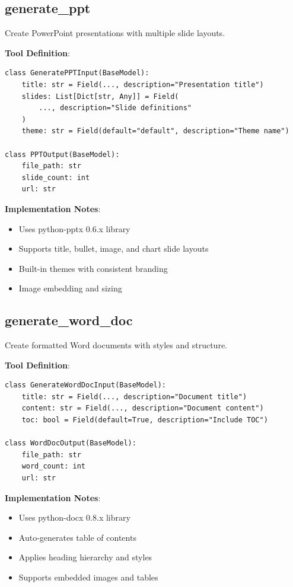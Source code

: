 \documentclass{report}
\begin{document}
\subsection{generate\_ppt}

Create PowerPoint presentations with multiple slide layouts.

\textbf{Tool Definition}:
\begin{lstlisting}
class GeneratePPTInput(BaseModel):
    title: str = Field(..., description="Presentation title")
    slides: List[Dict[str, Any]] = Field(
        ..., description="Slide definitions"
    )
    theme: str = Field(default="default", description="Theme name")

class PPTOutput(BaseModel):
    file_path: str
    slide_count: int
    url: str
\end{lstlisting}

\textbf{Implementation Notes}:
\begin{itemize}
    \item Uses python-pptx 0.6.x library
    \item Supports title, bullet, image, and chart slide layouts
    \item Built-in themes with consistent branding
    \item Image embedding and sizing
\end{itemize}

\subsection{generate\_word\_doc}

Create formatted Word documents with styles and structure.

\textbf{Tool Definition}:
\begin{lstlisting}
class GenerateWordDocInput(BaseModel):
    title: str = Field(..., description="Document title")
    content: str = Field(..., description="Document content")
    toc: bool = Field(default=True, description="Include TOC")

class WordDocOutput(BaseModel):
    file_path: str
    word_count: int
    url: str
\end{lstlisting}

\textbf{Implementation Notes}:
\begin{itemize}
    \item Uses python-docx 0.8.x library
    \item Auto-generates table of contents
    \item Applies heading hierarchy and styles
    \item Supports embedded images and tables
\end{itemize}
\end{document}
